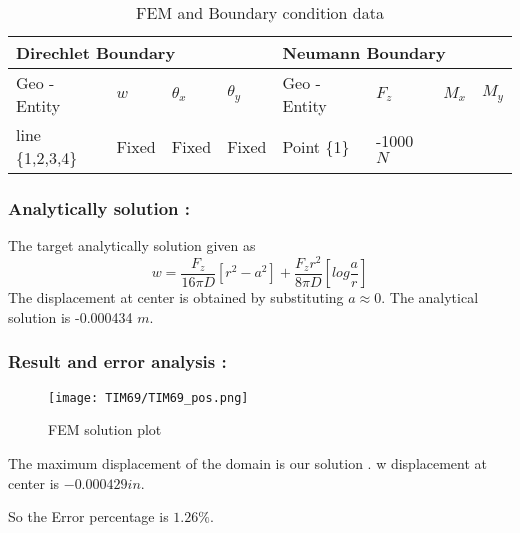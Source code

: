 \documentclass[VM.tex]{subfiles}
\begin{document}
\begin{table}[h!]
\renewcommand{\arraystretch}{1.5}
\centering
\caption{FEM and Boundary condition data}
\begin{tabular}{|l|lll|l|lll|}
\hline
 \multicolumn{4}{l|}{\cellcolor[HTML]{C0C0C0}Direchlet Boundary} & \multicolumn{4}{l|}{\cellcolor[HTML]{C0C0C0}Neumann Boundary} \\ \hline \hline
  Geo - \newline Entity      & $w$          & $\theta _ x$     & $\theta _ y $    & Geo - \newline Entity         & $F_z$        & $M_x$        & $M_y$        \\ \hline    
 line \{1,2,3,4\}                   & Fixed      & Fixed         & Fixed        & Point \{1\}                    & -1000 $N$        &           &           \\ \hline
\end{tabular}
\end{table}
\subsubsection*{Analytically solution : }
The target analytically solution given as
\begin{equation}
w = \frac{F_z}{16 \pi D}\left[ r^2 - a^2 \right]+\frac{F_zr^2}{8 \pi D}\left[ log \frac{a}{r} \right]
\end{equation} 
The displacement at center is obtained by substituting $a\approx0$. The analytical solution is -0.000434 $m$.

\subsubsection*{Result and error analysis : }

\begin{figure}[h!]
\centering
{}%
  \texttt{[image: TIM69/TIM69\_pos.png]}
  \caption{FEM solution plot}
\endminipage
\end{figure}
The maximum displacement of the domain is our solution . w displacement at center is $ -0.000429 in $.


So the Error percentage is $ 1.26 \% $. 
\end{document}

